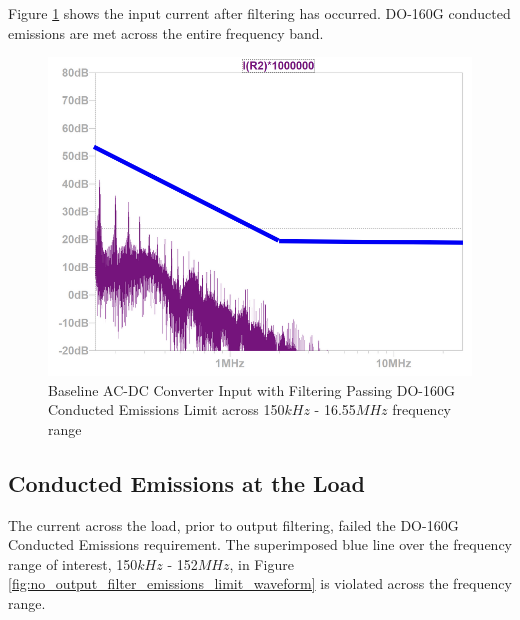 \documentclass[conference]{IEEEtran}
\begin{document}
Figure \ref{fig:input_filter_emissions_limit_waveform} shows the input current after filtering has occurred. DO-160G conducted emissions are met across the entire frequency band.

\begin{figure}[htb]
    \centering
    \includegraphics[width=1.0\linewidth]{input_filter_emissions_limit.png}
    \caption{Baseline AC-DC Converter Input with Filtering Passing DO-160G Conducted Emissions Limit across 150$kHz$ - 16.55$MHz$ frequency range}
    \label{fig:input_filter_emissions_limit_waveform}
\end{figure}

\subsection{Conducted Emissions at the Load}
The current across the load, prior to output filtering, failed the DO-160G Conducted Emissions requirement. The superimposed blue line over the frequency range of interest, 150$kHz$ - 152$MHz$, in Figure \ref{fig:no_output_filter_emissions_limit_waveform} is violated across the frequency range.
\end{document}
